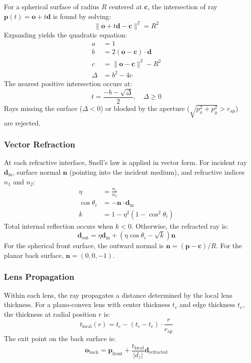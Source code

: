 For a spherical surface of radius $R$ centered at $\mathbf{c}$, the intersection of ray $\mathbf{p}(t) = \mathbf{o} + t\mathbf{d}$ is found by solving:
\begin{equation}
\|\mathbf{o} + t\mathbf{d} - \mathbf{c}\|^2 = R^2
\end{equation}
Expanding yields the quadratic equation:
\begin{align}
a &= 1 \\
b &= 2(\mathbf{o} - \mathbf{c}) \cdot \mathbf{d} \\
c &= \|\mathbf{o} - \mathbf{c}\|^2 - R^2 \\
\Delta &= b^2 - 4c
\end{align}
The nearest positive intersection occurs at:
\begin{equation}
t = \frac{-b - \sqrt{\Delta}}{2}, \quad \Delta \geq 0
\end{equation}
Rays missing the surface ($\Delta < 0$) or blocked by the aperture ($\sqrt{p_x^2 + p_y^2} > r_{\text{ap}}$) are rejected.

\subsubsection{Vector Refraction}

At each refractive interface, Snell's law is applied in vector form. For incident ray $\mathbf{d}_{\text{in}}$, surface normal $\mathbf{n}$ (pointing into the incident medium), and refractive indices $n_1$ and $n_2$:
\begin{align}
\eta &= \frac{n_1}{n_2} \\
\cos\theta_i &= -\mathbf{n} \cdot \mathbf{d}_{\text{in}} \\
k &= 1 - \eta^2(1 - \cos^2\theta_i)
\end{align}
Total internal reflection occurs when $k < 0$. Otherwise, the refracted ray is:
\begin{equation}
\mathbf{d}_{\text{out}} = \eta \mathbf{d}_{\text{in}} + (\eta \cos\theta_i - \sqrt{k})\mathbf{n}
\end{equation}
For the spherical front surface, the outward normal is $\mathbf{n} = (\mathbf{p} - \mathbf{c})/R$. For the planar back surface, $\mathbf{n} = (0, 0, -1)$.

\subsubsection{Lens Propagation}

Within each lens, the ray propagates a distance determined by the local lens thickness. For a plano-convex lens with center thickness $t_c$ and edge thickness $t_e$, the thickness at radial position $r$ is:
\begin{equation}
t_{\text{local}}(r) = t_c - (t_c - t_e) \cdot \frac{r}{r_{\text{ap}}}
\end{equation}
The exit point on the back surface is:
\begin{equation}
\mathbf{o}_{\text{back}} = \mathbf{p}_{\text{front}} + \frac{t_{\text{local}}}{|d_z|} \mathbf{d}_{\text{refracted}}
\end{equation}


